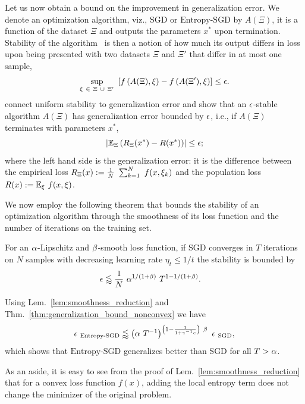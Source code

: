 \documentclass[10pt]{article}
\newcommand{\entropysgd}{\mathrm{Entropy}\textrm{-}\mathrm{SGD}}
\begin{document}
Let us now obtain a bound on the improvement in generalization error. We denote an optimization algorithm, viz., SGD or $\entropysgd$ by $A(\Xi)$, it is a function of the dataset $\Xi$ and outputs the parameters $x^*$ upon termination. Stability of the algorithm~\citep{bousquet2002stability} is then a notion of how much its output differs in loss upon being presented with two datasets $\Xi$ and $\Xi'$ that differ in at most one sample,
$$
    \sup_{\xi\ \in\ \Xi\ \cup\ \Xi'}\ \left[ f \left(A(\Xi), \xi\right) - f \left(A(\Xi'), \xi\right)\right] \leq \epsilon.
$$
\citet{hardt2015train} connect uniform stability to generalization error and show that an $\epsilon$-stable algorithm $A(\Xi)$ has generalization error bounded by $\epsilon$, i.e., if $A(\Xi)$ terminates with parameters $x^*$,
$$
    \left|  \mathbb{E}_{\Xi} \left(R_\Xi(x^*) - R(x^*)\right)  \right| \leq \epsilon;
$$
where the left hand side is the generalization error: it is the difference between the empirical loss $R_\Xi(x) := \frac{1}{N}\ \sum_{k=1}^N\ f(x, \xi_k)$ and the population loss $R(x) := \mathbb{E}_{\xi}\ f(x, \xi)$.

We now employ the following theorem that bounds the stability of an optimization algorithm through the smoothness of its loss function and the number of iterations on the training set.
\begin{theorem}
\label{thm:generalization_bound_nonconvex}
For an $\alpha$-Lipschitz and $\beta$-smooth loss function, if SGD converges in $T$ iterations on $N$ samples with decreasing learning rate $\eta_t \leq 1/t$ the stability is bounded by
\begin{align*}
    \epsilon
    &\lessapprox \frac{1}{N}\ \alpha^{1/(1 + \beta)}\ T^{1 - 1/(1 + \beta)}.
\end{align*}
\end{theorem}
%
Using Lem.~\ref{lem:smoothness_reduction} and Thm.~\ref{thm:generalization_bound_nonconvex} we have
\begin{equation}
    \e_{\ \entropysgd} \lessapprox \rbrac{\a\ T^{-1}}^{\rbrac{1 - \f{1}{1 + \g^{-1}c}}\ \b}\ \e_{\ \textrm{SGD}},
    \label{eq:stability_bound}
\end{equation}
which shows that $\entropysgd$ generalizes better than SGD for all $T > \alpha$.

As an aside, it is easy to see from the proof of Lem.~\ref{lem:smoothness_reduction} that for a convex loss function $f(x)$, adding the local entropy term does not change the minimizer of the original problem.
\end{document}
